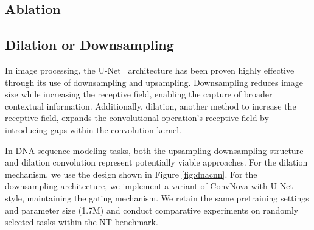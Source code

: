 



\subsection{Ablation}

\subsection{Dilation or Downsampling}\label{downsample}
In image processing, the U-Net~\citep{ronneberger2015u} architecture has been proven highly effective through its use of downsampling and upsampling. Downsampling reduces image size while increasing the receptive field, enabling the capture of broader contextual information. Additionally, dilation, another method to increase the receptive field, expands the convolutional operation's receptive field by introducing gaps within the convolution kernel.


In DNA sequence modeling tasks, both the upsampling-downsampling structure and dilation convolution represent potentially viable approaches. For the dilation mechanism, we use the design shown in Figure \ref{fig:dnacnn}. For the downsampling architecture, we implement a variant of ConvNova with U-Net style, maintaining the gating mechanism. We retain the same pretraining settings and parameter size (1.7M) and conduct comparative experiments on randomly selected tasks within the NT benchmark. 

